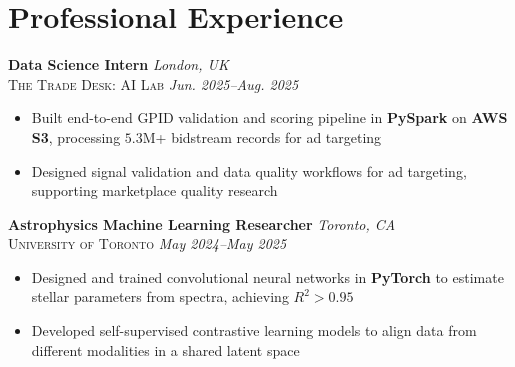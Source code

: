 \documentclass[10pt, letterpaper]{article}
\newenvironment{highlightsforbulletentries}{
    \begin{itemize}[
        topsep=0.05 cm,
        parsep=0.01 cm,
        partopsep=0pt,
        itemsep=0pt,
        leftmargin=10pt
    ]
}{
    \end{itemize}
} %
\newenvironment{onecolentry}{
    \begin{adjustwidth}{
    }{
    }
}{
    \end{adjustwidth}
} %
\newcommand{\lightfont}[1]{{\fontseries{l}\selectfont #1}}
\begin{document}
    \section{Professional Experience}
     \textbf{Data Science Intern} \hfill \textit{London, UK} \\
            \textsc{The Trade Desk: AI Lab} \hfill \textit{\lightfont{Jun. 2025--Aug. 2025}}
            \begin{highlightsforbulletentries}
                \item Built end-to-end GPID validation and scoring pipeline in \textbf{PySpark} on \textbf{AWS S3}, processing $5.3$M+ bidstream records for ad targeting
                \item Designed signal validation and data quality workflows for ad targeting, supporting marketplace quality research
            \end{highlightsforbulletentries}
             \vspace{0.2 cm}
        \begin{onecolentry}
            \textbf{Astrophysics Machine Learning Researcher} \hfill \textit{Toronto, CA} \\
            \textsc{University of Toronto} \hfill \textit{\lightfont{May 2024--May 2025}}
            \begin{highlightsforbulletentries}
                \item Designed and trained  convolutional neural networks in \textbf{PyTorch} to estimate stellar parameters from spectra, achieving $R^2 > 0.95$
                \item Developed self-supervised contrastive learning models
    to align data from different modalities in a shared latent space
            \end{highlightsforbulletentries}
        \end{onecolentry}

        \vspace{0.2 cm}
\end{document}
